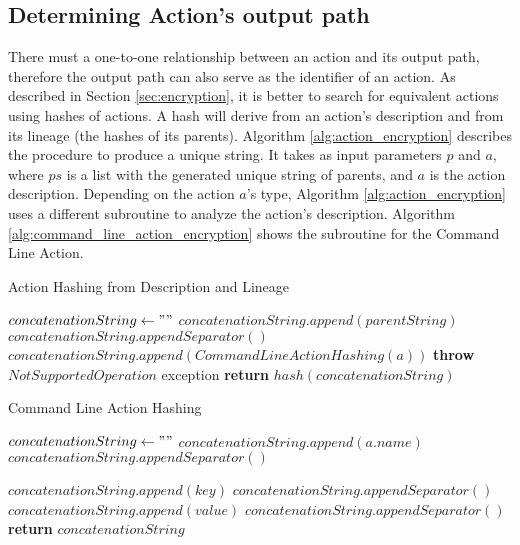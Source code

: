 \subsection{Determining Action's output path}
There must a one-to-one relationship between an action and its output path, therefore the output path can also serve as the identifier of an action. As described in Section \ref{sec:encryption}, it is better to search for equivalent actions using hashes of actions. A hash will derive from an action's description and from its lineage (the hashes of its parents). Algorithm \ref{alg:action_encryption} describes the procedure to produce a unique string.  It takes as input parameters $p$ and $a$, where $ps$ is a list with the generated unique string of parents, and $a$ is the action description.  Depending on the action $a$'s type, Algorithm \ref{alg:action_encryption} uses a different subroutine to analyze the action's description. Algorithm \ref{alg:command_line_action_encryption} shows the subroutine for the Command Line Action.

\begin{algorithm}
\begin{singlespace}
\caption{Action Hashing from Description and Lineage}
\label{alg:action_encryption}
\begin{algorithmic}[1]
\State $concatenationString \gets ""$
	\State $concatenationString.append(parentString)$
	\State $concatenationString.appendSeparator()$
\EndFor
{}
	\State $concatenationString.append(CommandLineActionHashing(a))$
\Else
	\State \textbf{throw} $NotSupportedOperation$ exception
\EndIf
\State \textbf{return} $hash(concatenationString)$

\EndProcedure
\end{algorithmic}
\end{singlespace}
\end{algorithm}

\begin{algorithm}
\begin{singlespace}
\caption{Command Line Action Hashing}
\label{alg:command_line_action_encryption}
\begin{algorithmic}[1]
\State $concatenationString \gets " "$
\State $concatenationString.append(a.name)$
\State $concatenationString.appendSeparator()$

	\State $concatenationString.append(key)$
	\State $concatenationString.appendSeparator()$
	\State $concatenationString.append(value)$
	\State $concatenationString.appendSeparator()$
\EndFor
	\State \textbf{return} $concatenationString$
\EndProcedure
\end{algorithmic}
\end{singlespace}
\end{algorithm}

